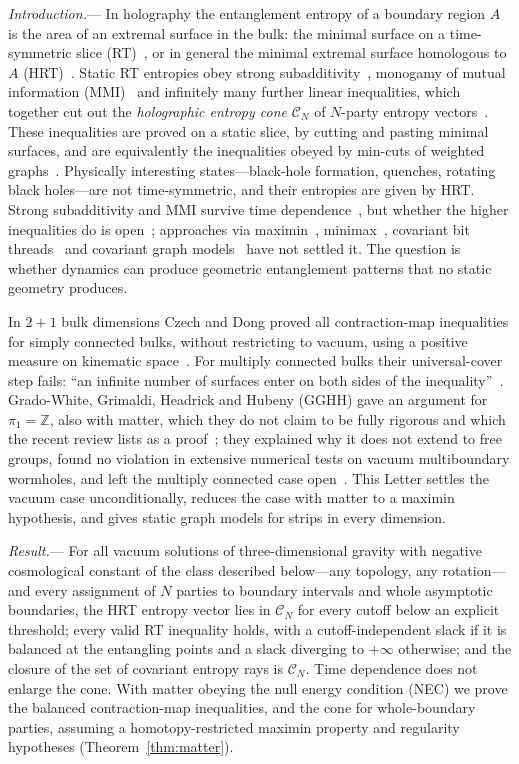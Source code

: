 \documentclass[aps,prl,twocolumn,superscriptaddress,nofootinbib,amsmath,amssymb]{revtex4-2}
\newcommand{\ScopeClass}{vacuum solutions of three-dimensional gravity with negative cosmological constant}
\theoremstyle{definition}
\newcommand{\CN}{\mathcal{C}_N}
\begin{document}
\emph{Introduction.}---%
In holography the entanglement entropy of a boundary region $A$ is the area of an extremal surface in the
bulk: the minimal surface on a time-symmetric slice (RT)~\cite{RyuTakayanagi2006}, or in general the
minimal extremal surface homologous to $A$ (HRT)~\cite{HRT2007}. Static RT entropies obey strong
subadditivity~\cite{HeadrickTakayanagi2007}, monogamy of mutual information (MMI)~\cite{HaydenHeadrickMaloney2013}
and infinitely many further linear inequalities, which together cut out the \emph{holographic entropy cone}
$\CN$ of $N$-party entropy vectors~\cite{Bao2015,HernandezCuenca2019,AvisHernandezCuenca2023}. These
inequalities are proved on a static slice, by cutting and pasting minimal surfaces, and are equivalently the
inequalities obeyed by min-cuts of weighted graphs~\cite{Bao2015}. Physically interesting states---black-hole
formation, quenches, rotating black holes---are not time-symmetric, and their entropies are given by HRT.
Strong subadditivity and MMI survive time dependence~\cite{Wall2014}, but whether the higher inequalities do
is open~\cite{GGHH2025,GrimaldiHeadrick2026}; approaches via maximin~\cite{Wall2014},
minimax~\cite{GGHHMinimax2025}, covariant bit threads~\cite{HeadrickHubeny2023} and covariant graph
models~\cite{Zhao2026} have not settled it. The question is whether dynamics can produce geometric
entanglement patterns that no static geometry produces.

In $2+1$ bulk dimensions Czech and Dong proved all contraction-map inequalities for simply connected bulks,
without restricting to vacuum, using a positive measure on kinematic space~\cite{CzechDong2019}. For multiply
connected bulks their universal-cover step fails: ``an infinite number of surfaces enter on both sides of the
inequality''~\cite{GGHH2025}. Grado-White, Grimaldi, Headrick and Hubeny (GGHH) gave an argument for
$\pi_1=\mathbb{Z}$, also with matter, which they do not claim to be fully rigorous and which the recent review
lists as a proof~\cite{GrimaldiHeadrick2026}; they explained why it does not extend to free groups, found no
violation in extensive numerical tests on vacuum multiboundary wormholes, and left the multiply connected case
open~\cite{GGHH2025}. This Letter settles the vacuum case unconditionally, reduces the case with matter to a
maximin hypothesis, and gives static graph models for strips in every dimension.

\emph{Result.}---%
For all \ScopeClass{} of the class described below---any topology, any rotation---and every assignment of
$N$ parties to boundary intervals and whole asymptotic boundaries, the HRT entropy vector lies in $\CN$ for
every cutoff below an explicit threshold; every valid RT inequality holds, with a cutoff-independent slack if
it is balanced at the entangling points and a slack diverging to $+\infty$ otherwise; and the closure of the
set of covariant entropy rays is $\CN$. Time dependence does not enlarge the cone. With matter obeying the null
energy condition (NEC) we prove the balanced contraction-map inequalities, and the cone for whole-boundary parties,
assuming a homotopy-restricted maximin property and regularity hypotheses (Theorem~\ref{thm:matter}).
\end{document}
